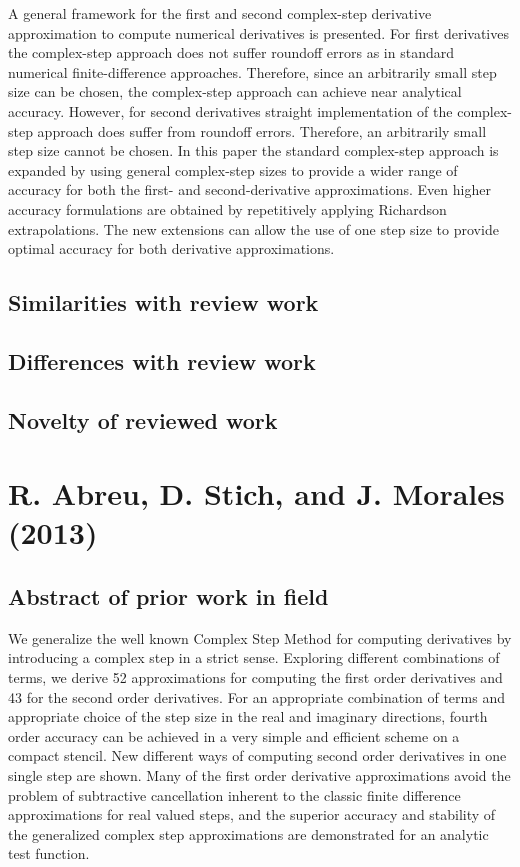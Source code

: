 \documentclass[10pt,letterpaper,draft]{article}
\begin{document}
A general framework for the first and second complex-step derivative
approximation to compute numerical derivatives is presented.  For first
derivatives the complex-step approach does not suffer roundoff errors as in
standard numerical finite-difference approaches.  Therefore, since an
arbitrarily small step size can be chosen, the complex-step approach can
achieve near analytical accuracy.  However, for second derivatives straight
implementation of the complex-step approach does suffer from roundoff errors.
Therefore, an arbitrarily small step size cannot be chosen. In this paper the
standard complex-step approach is expanded by using general complex-step sizes
to provide a wider range of accuracy for both the first- and second-derivative
approximations. Even higher accuracy formulations are obtained by repetitively
applying Richardson extrapolations. The new extensions can allow the use of one
step size to provide optimal accuracy for both derivative approximations.

\subsection{Similarities with review work}
\subsection{Differences with review work}
\subsection{Novelty of reviewed work}

\section{R. Abreu, D. Stich, and J. Morales (2013)}
\subsection{Abstract of prior work in field}

We generalize the well known Complex Step Method for computing derivatives by
introducing a complex step in a strict sense. Exploring different combinations
of terms, we derive 52 approximations for computing the first order derivatives
and 43 for the second order derivatives. For an appropriate combination of
terms and appropriate choice of the step size in the real and imaginary
directions, fourth order accuracy can be achieved in a very simple and
efficient scheme on a compact stencil. New different ways of computing second
order derivatives in one single step are shown. Many of the first order
derivative approximations avoid the problem of subtractive cancellation
inherent to the classic finite difference approximations for real valued steps,
and the superior accuracy and stability of the generalized complex step
approximations are demonstrated for an analytic test function.
\end{document}
